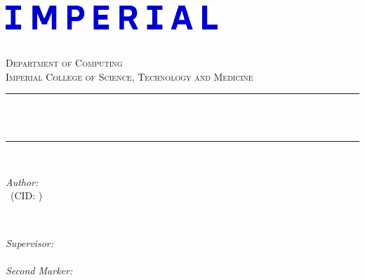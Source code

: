 \begin{titlepage}

\newcommand{\HRule}{\rule{\linewidth}{0.5mm}} 


\hspace{-0.6cm} 
\includegraphics[width=8cm]{./Figures/imperial-new-logo.png}\\[0.5cm]
\vspace{2cm}

\begin{center} %

\selectfont\textsc{\LARGE \reporttype \\[0.2cm]}
\vspace{1.3cm}
\selectfont\textsc{\Large Department of Computing}\\[0.5cm] 
\selectfont\textsc{\large Imperial College of Science, Technology and Medicine}\\[0.5cm] 
\HRule \\[0.2cm]
{ \setlength{\baselineskip}{1.2\baselineskip}
    \huge \bfseries \reporttitle \\[0.3cm]}
\HRule \\[1.5cm]
\end{center}


\centering
\begin{minipage}{0.5\textwidth}
\begin{flushleft} \large
\textit{Author:}\\
\reportauthor~(CID: \cid)
\end{flushleft}
\end{minipage}
~
\begin{minipage}{0.4\textwidth}
\begin{flushright} \large
\textit{Supervisor:} \\
\supervisor \\
\vspace{0.5cm}
\textit{Second Marker:} \\
\secondmarker
\end{flushright}
\end{minipage}\\[2cm]
\makeatother


\end{titlepage}
